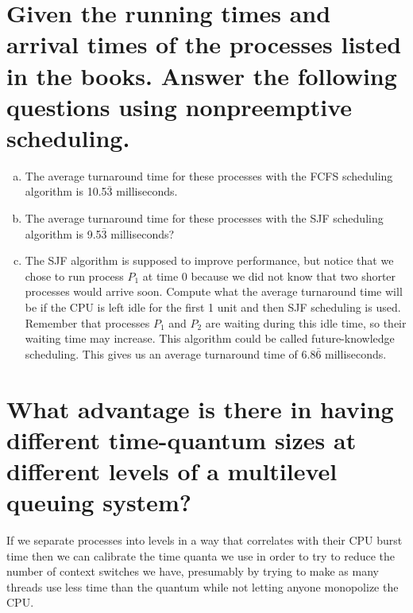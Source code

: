 \documentclass{book}%
\begin{document}
\section{Given the running times and arrival times of the processes listed in
the books. Answer the following questions using nonpreemptive scheduling.}
\begin{enumerate}[(a)]
\item The average turnaround time for these processes with the FCFS scheduling
algorithm is 10.5$\bar{3}$ milliseconds.
\item The average turnaround time for these processes with the SJF scheduling
algorithm is 9.5$\bar{3}$ milliseconds?
\item The SJF algorithm is supposed to improve performance, but notice that we
chose to run process $P_1$ at time 0 because we did not know that two shorter
processes would arrive soon. Compute what the average turnaround time will be
if the CPU is left idle for the first 1 unit and then SJF scheduling is used.
Remember that processes $P_1$ and $P_2$ are waiting during this idle time, so
their waiting time may increase. This algorithm could be called future-knowledge
scheduling. This gives us an average turnaround time of 6.8$\bar{6}$ 
milliseconds.
\end{enumerate}
\section{What advantage is there in having different time-quantum sizes at
different levels of a multilevel queuing system?}
If we separate processes into levels in a way that correlates with their CPU
burst time then we can calibrate the time quanta we use in order to try to
reduce the number of context switches we have, presumably by trying to make as
many threads use less time than the quantum while not letting anyone monopolize
the CPU.
\end{document}
